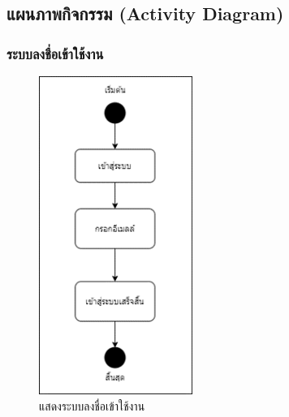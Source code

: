\documentclass[12pt,oneside,openright,a4paper]{cpe-thai-project}
\begin{document}
\newpage
\subsection{แผนภาพกิจกรรม (Activity Diagram)}
\subsubsection{ระบบลงชื่อเข้าใช้งาน}

\begin{figure}[!h]
  \centering
  \includegraphics[width=5cm]{./image/ad-login.png}
  \caption{แสดงระบบลงชื่อเข้าใช้งาน}
  \label{fig:ad-login}
\end{figure}
\end{document}
